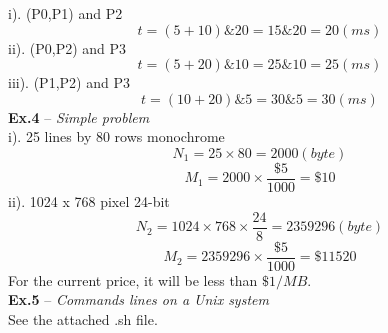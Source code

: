 \documentclass{article}
\begin{document}
\begin{spacing}{2.0}
i). (P0,P1) and P2\\
$$t=(5+10)\&20=15\&20=20(ms)$$
ii). (P0,P2) and P3\\
$$t=(5+20)\&10=25\&10=25(ms)$$
iii). (P1,P2) and P3\\
$$t=(10+20)\&5=30\&5=30(ms)$$
\noindent\textbf{Ex.4} -- \textit{Simple problem}\\
i). 25 lines by 80 rows monochrome
$$N_1=25\times80=2000(byte)$$
$$M_1=2000\times\frac{\$5}{1000}=\$10$$
ii). 1024 x 768 pixel 24-bit
$$N_2=1024\times768\times\frac{24}{8}=2359296(byte)$$
$$M_2=2359296\times\frac{\$5}{1000}=\$11520$$
For the current price, it will be less than $\$1/MB$.\\
\noindent\textbf{Ex.5} -- \textit{Commands lines on a Unix system}\\
See the attached .sh file.
\end{spacing}
\end{document}
